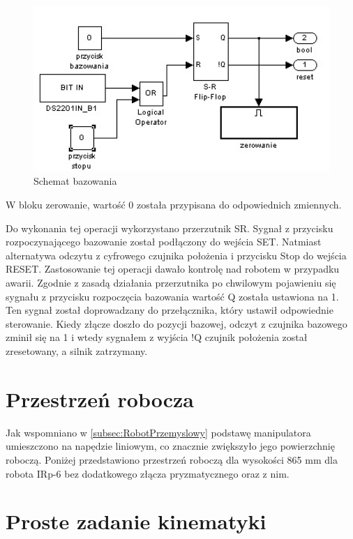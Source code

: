 \begin{figure}
\centering
\includegraphics[width=12cm] {dodatki/bazowanie_p1_wyciete.jpg}
\caption{Schemat bazowania}
\label{fig:schemat_bazowania}
\end{figure}
W bloku zerowanie, wartość 0 została przypisana do odpowiednich zmiennych. 

Do wykonania tej operacji wykorzystano przerzutnik SR. Sygnał z przycisku rozpoczynającego bazowanie został podłączony do wejścia SET. Natmiast alternatywa odczytu z cyfrowego czujnika położenia i przycisku Stop do wejścia RESET. Zastosowanie tej operacji dawało kontrolę nad robotem w przypadku awarii. Zgodnie z zasadą działania przerzutnika po chwilowym pojawieniu się sygnału z przycisku rozpoczęcia bazowania wartość Q została ustawiona na 1. Ten sygnał został doprowadzany do przełącznika, który ustawił odpowiednie sterowanie. Kiedy złącze doszło do pozycji bazowej, odczyt z czujnika bazowego zminił się na 1 i wtedy sygnałem z wyjścia !Q czujnik położenia został zresetowany, a silnik zatrzymany.

\section{Przestrzeń robocza}
\label{sec:przestrzen_robocza}

Jak wspomniano w \ref{subsec:RobotPrzemyslowy} podstawę manipulatora umieszczono na napędzie liniowym, co znacznie zwiększyło jego powierzchnię roboczą. 
Poniżej przedstawiono przestrzeń roboczą dla wysokości 865 mm dla robota IRp-6 bez dodatkowego złącza pryzmatycznego oraz z nim.


\section{Proste zadanie kinematyki}
\label{sec:proste_zad_kinematyki}

